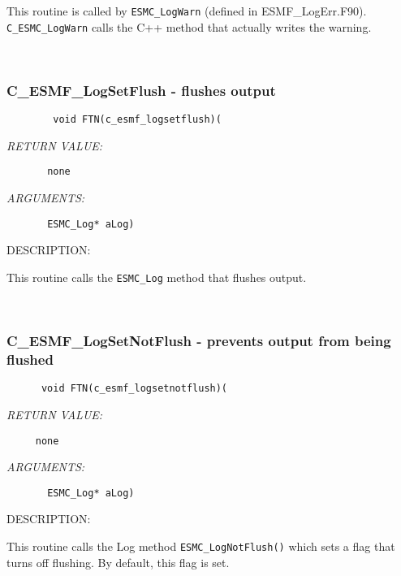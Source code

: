      This routine is called by {\tt ESMC\_LogWarn} (defined in ESMF\_LogErr.F90).  
      {\tt C\_ESMC\_LogWarn} calls the C++ method that actually writes the warning.
   
 
\mbox{}\hrulefill\ 
 
\subsubsection [C\_ESMF\_LogSetFlush] {C\_ESMF\_LogSetFlush - flushes output}


  
\begin{verbatim}        void FTN(c_esmf_logsetflush)(\end{verbatim}{\em RETURN VALUE:}
\begin{verbatim}       none\end{verbatim}{\em ARGUMENTS:}
\begin{verbatim}    
       ESMC_Log* aLog)\end{verbatim}
{\sf DESCRIPTION:\\ }


    This routine calls the {\tt ESMC\_Log} method that flushes output.
   
 
\mbox{}\hrulefill\ 
 
\subsubsection [C\_ESMF\_LogSetNotFlush] {C\_ESMF\_LogSetNotFlush - prevents output from being flushed}


  
\begin{verbatim}      void FTN(c_esmf_logsetnotflush)(\end{verbatim}{\em RETURN VALUE:}
\begin{verbatim}     none\end{verbatim}{\em ARGUMENTS:}
\begin{verbatim}       ESMC_Log* aLog)
 \end{verbatim}
{\sf DESCRIPTION:\\ }


      This routine calls the Log method {\tt ESMC\_LogNotFlush()} which sets a flag
      that turns off flushing. By default, this flag is set.
   
